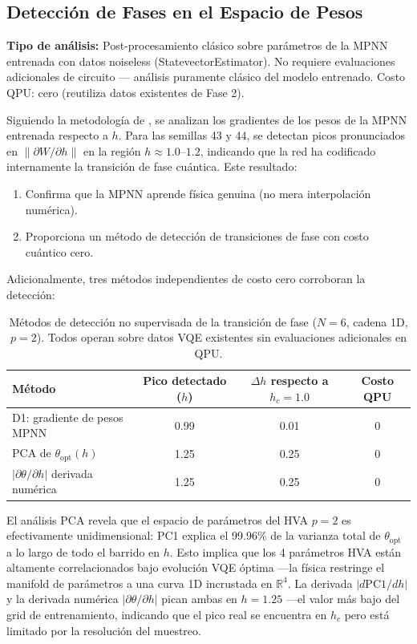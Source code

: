 \documentclass[11pt,a4paper,spanish]{book}
\begin{document}
\subsection{Detección de Fases en el Espacio de Pesos}

\textbf{Tipo de análisis:} Post-procesamiento clásico sobre parámetros de la MPNN entrenada con datos noiseless (StatevectorEstimator). No requiere evaluaciones adicionales de circuito --- análisis puramente clásico del modelo entrenado. Costo QPU: cero (reutiliza datos existentes de Fase 2).

Siguiendo la metodología de \citet{hernandes2025}, se analizan los gradientes de los pesos de la MPNN entrenada respecto a $h$. Para las semillas 43 y 44, se detectan picos pronunciados en $\|\partial W / \partial h\|$ en la región $h \approx 1.0$--$1.2$, indicando que la red ha codificado internamente la transición de fase cuántica. Este resultado:
\begin{enumerate}
    \item Confirma que la MPNN aprende física genuina (no mera interpolación numérica).
    \item Proporciona un método de detección de transiciones de fase con costo cuántico cero.
\end{enumerate}

Adicionalmente, tres métodos independientes de costo cero corroboran la detección:

\begin{table}[h]
\centering
\caption{Métodos de detección no supervisada de la transición de fase ($N = 6$, cadena 1D, $p = 2$). Todos operan sobre datos VQE existentes sin evaluaciones adicionales en QPU.}
\label{tab:unsupervised_detection}
\begin{tabular}{lccc}
\toprule
\textbf{Método} & \textbf{Pico detectado ($h$)} & \textbf{$\Delta h$ respecto a $h_c = 1.0$} & \textbf{Costo QPU} \\
\midrule
D1: gradiente de pesos MPNN & 0.99 & 0.01 & 0 \\
PCA de $\theta_{\text{opt}}(h)$ & 1.25 & 0.25 & 0 \\
$|\partial\theta/\partial h|$ derivada numérica & 1.25 & 0.25 & 0 \\
\bottomrule
\end{tabular}
\end{table}

El análisis PCA revela que el espacio de parámetros del HVA $p = 2$ es efectivamente unidimensional: PC1 explica el 99.96\% de la varianza total de $\theta_{\text{opt}}$ a lo largo de todo el barrido en $h$. Esto implica que los 4 parámetros HVA están altamente correlacionados bajo evolución VQE óptima ---la física restringe el manifold de parámetros a una curva 1D incrustada en $\mathbb{R}^4$. La derivada $|d\text{PC1}/dh|$ y la derivada numérica $|\partial\theta/\partial h|$ pican ambas en $h = 1.25$ ---el valor más bajo del grid de entrenamiento, indicando que el pico real se encuentra en $h_c$ pero está limitado por la resolución del muestreo.
\end{document}
